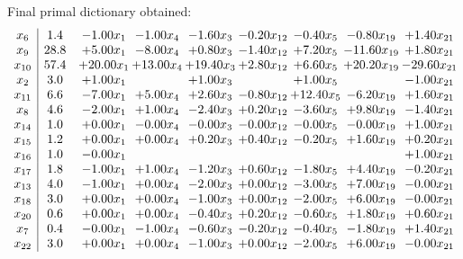 \documentclass[8pt]{article}
\begin{document}
 Final primal dictionary obtained: 
\[\begin{array}{c| c c@{\hskip 2pt} c@{\hskip 2pt} c@{\hskip 2pt} c@{\hskip 2pt} c@{\hskip 2pt} c@{\hskip 2pt} c@{\hskip 2pt} }
 x_{6}   &  1.4 & -1.00 x_{1} & -1.00 x_{4} & -1.60 x_{3} & -0.20 x_{12} & -0.40 x_{5} & -0.80 x_{19} & +  1.40 x_{21}\\
 x_{9}   &  28.8 & +  5.00 x_{1} & -8.00 x_{4} & +  0.80 x_{3} & -1.40 x_{12} & +  7.20 x_{5} & -11.60 x_{19} & +  1.80 x_{21}\\
 x_{10}   &  57.4 & + 20.00 x_{1} & + 13.00 x_{4} & + 19.40 x_{3} & +  2.80 x_{12} & +  6.60 x_{5} & + 20.20 x_{19} & -29.60 x_{21}\\
 x_{2}   &  3.0 & +  1.00 x_{1} &   & +  1.00 x_{3} &   & +  1.00 x_{5} &   & -1.00 x_{21}\\
 x_{11}   &  6.6 & -7.00 x_{1} & +  5.00 x_{4} & +  2.60 x_{3} & -0.80 x_{12} & + 12.40 x_{5} & -6.20 x_{19} & +  1.60 x_{21}\\
 x_{8}   &  4.6 & -2.00 x_{1} & +  1.00 x_{4} & -2.40 x_{3} & +  0.20 x_{12} & -3.60 x_{5} & +  9.80 x_{19} & -1.40 x_{21}\\
 x_{14}   &  1.0 & +  0.00 x_{1} & -0.00 x_{4} & -0.00 x_{3} & -0.00 x_{12} & -0.00 x_{5} & -0.00 x_{19} & +  1.00 x_{21}\\
 x_{15}   &  1.2 & +  0.00 x_{1} & +  0.00 x_{4} & +  0.20 x_{3} & +  0.40 x_{12} & -0.20 x_{5} & +  1.60 x_{19} & +  0.20 x_{21}\\
 x_{16}   &  1.0 & -0.00 x_{1} &    &    &    &    &   & +  1.00 x_{21}\\
 x_{17}   &  1.8 & -1.00 x_{1} & +  1.00 x_{4} & -1.20 x_{3} & +  0.60 x_{12} & -1.80 x_{5} & +  4.40 x_{19} & -0.20 x_{21}\\
 x_{13}   &  4.0 & -1.00 x_{1} & +  0.00 x_{4} & -2.00 x_{3} & +  0.00 x_{12} & -3.00 x_{5} & +  7.00 x_{19} & -0.00 x_{21}\\
 x_{18}   &  3.0 & +  0.00 x_{1} & +  0.00 x_{4} & -1.00 x_{3} & +  0.00 x_{12} & -2.00 x_{5} & +  6.00 x_{19} & -0.00 x_{21}\\
 x_{20}   &  0.6 & +  0.00 x_{1} & +  0.00 x_{4} & -0.40 x_{3} & +  0.20 x_{12} & -0.60 x_{5} & +  1.80 x_{19} & +  0.60 x_{21}\\
 x_{7}   &  0.4 & -0.00 x_{1} & -1.00 x_{4} & -0.60 x_{3} & -0.20 x_{12} & -0.40 x_{5} & -1.80 x_{19} & +  1.40 x_{21}\\
 x_{22}   &  3.0 & +  0.00 x_{1} & +  0.00 x_{4} & -1.00 x_{3} & +  0.00 x_{12} & -2.00 x_{5} & +  6.00 x_{19} & -0.00 x_{21}\\

\end{array}\]
\end{document}
